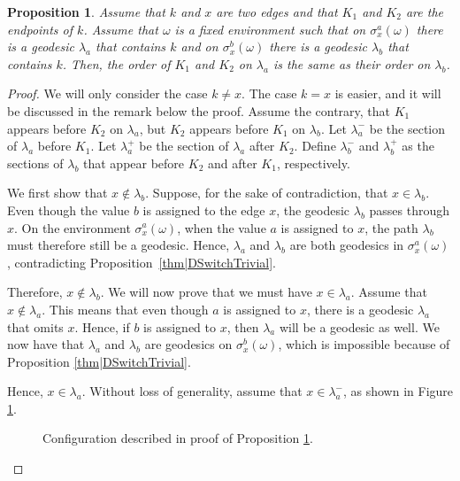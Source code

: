 \documentclass[reqno]{amsart}
\newtheorem{proposition}[theorem]{Proposition}
\begin{document}
\begin{proposition}\label{thm|DSwitch2} Assume that $k$ and $x$ are two edges and 
that $K_1$ and $K_2$ are the endpoints of $k$.
Assume that $\omega$ is a fixed environment such that 
on $\sigma_x^a(\omega)$ there is a geodesic 
$\lambda_a$ that contains $k$ and on $\sigma_x^b(\omega)$ there is a geodesic $\lambda_b$ that contains $k$.
Then, the order of $K_1$ and $K_2$ on $\lambda_a$ is the same as their order on $\lambda_b$. 
\end{proposition} 
\begin{proof}  We will only consider the case $k\neq x$. The case $k=x$ is easier, and it will be discussed in the remark below the proof.
Assume the contrary, that $K_1$ appears before $K_2$ on $\lambda_a$, but $K_2$ appears before $K_1$ on $\lambda_b$. 
Let $\lambda_a^-$  be the section of $\lambda_a$ before $K_1$. Let $\lambda_a^+$ be the section of $\lambda_a$ after $K_2$. Define $\lambda_b^-$ and $\lambda_b^+$ as the sections of $\lambda_b$ that appear before $K_2$ and after $K_1$, respectively. 

We first show that \(x \notin \lambda_b\). Suppose, for the sake of contradiction, that \(x \in \lambda_b\). Even though the value \(b\) is assigned to the edge \(x\), the geodesic \(\lambda_b\) passes through \(x\). On the environment $\sigma_x^a(\omega)$, when the value \(a\) is assigned to \(x\), the path \(\lambda_b\) must therefore still be a geodesic. Hence, \(\lambda_a\) and \(\lambda_b\) are both geodesics in \(\sigma_x^a(\omega)\), contradicting Proposition~\ref{thm|DSwitchTrivial}.
 

Therefore, $x\not\in\lambda_b$. We will now prove that we must have $x\in\lambda_a$. Assume that $x\not \in \lambda_a$. This means that even though $a$ is assigned to $x$, there is a geodesic $\lambda_a$ that omits $x$. Hence, if $b$ is assigned to $x$, then $\lambda_a$ will be a geodesic as well. We now have that $\lambda_a$ and $\lambda_b$ are geodesics on $\sigma_x^b(\omega)$, which is impossible because of Proposition \ref{thm|DSwitchTrivial}.

Hence, $x\in\lambda_a$. Without loss of generality, assume that $x\in\lambda_a^-$, as shown in Figure \ref{fig|DSwitching2}.
 \begin{figure}[t]
 \centering
{}
\caption{Configuration described in proof of Proposition \ref{thm|DSwitch2}.}
\label{fig|DSwitching2}
\end{figure}


\end{proof}
\end{document}
